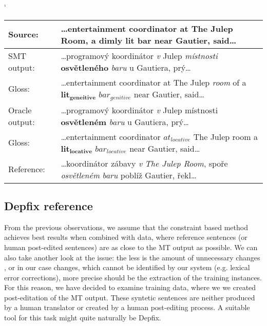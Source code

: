 \begin{myexample}
    \small
    \catcode`
    \begin{center}
    \begin{tabular}{|l|p{}|}
    \hline
    \textbf{Source:}  &  \textbf{…entertainment coordinator at The Julep Room, a dimly lit bar near Gautier, said…}  \\
    \hline
    SMT output:  &  …programový koordinátor \textit{v} Julep \textit{místnosti} \textbf{osvětleného} \textit{baru} u Gautiera, prý…  \\
    \hline
    Gloss:  &  …entertainment coordinator at The Julep \textit{room} of a $\mathbf{lit_{geneitive}}$ $\mathit{bar_{genitive}}$ near Gautier, said…  \\
    \hline
    Oracle output:  &  …programový koordinátor \textit{v} Julep místnosti \textbf{osvětleném} \textit{baru} u Gautiera, prý…  \\
    \hline
    Gloss:  &  …entertainment coordinator $\mathit{at_{locative}}$ The Julep room a $\mathbf{lit_{locative}}$ $\mathit{bar_{locative}}$ near Gautier, said…  \\
    \hline
    Reference:  &  …koordinátor zábavy \textit{v} \textit{The Julep Room}, spoře \textit{osvětleném} \textit{baru} poblíž Gautier, řekl…  \\
    \hline
    \end{tabular}
    \label{ex-oracle-ambig}
    \end{center}
\end{myexample}

\subsection{Depfix reference}

From the previous observations, we assume that the constraint based method achieves
best results when combined with data, where reference sentences
(or human post-edited sentences) are as close to the MT output as possible.
We can also take another look at the issue: the less is the amount of unnecessary changes
, or in our case changes, which cannot be identified by our system (e.g. lexical error corrections),
more precise should be the extraction of the training instances.
For this reason, we have decided to examine training data, where we we created  post-editation
of the MT output. These syntetic sentences are neither produced by a human translator
or created by a human post-editing process. A suitable tool for this task might quite naturally be Depfix.

